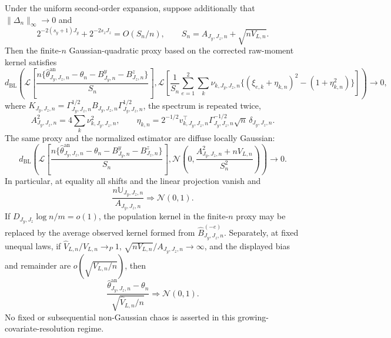 Under the uniform second-order expansion, suppose additionally that \(\|\Delta_n\|_\infty\to0\) and
\[
2^{-2(s_y+1)J_y}+2^{-2s_zJ_z}=O(S_n/n),
\qquad
S_n=A_{J_y,J_z,n}+\sqrt{nV_{L,n}}.
\]
Then the finite-\(n\) Gaussian-quadratic proxy based on the corrected raw-moment kernel satisfies
\[
d_{\mathrm{BL}}\!\left(
\mathcal L\left[\frac{n\{\widehat\theta^{\mathrm{an}}_{J_y,J_z,n}-\theta_n-B^y_{J_y,n}-B^z_{J_z,n}\}}{S_n}\right],
\mathcal L\left[\frac1{S_n}\sum_{e=1}^2\sum_k\nu_{k,J_y,J_z,n}
\{(\xi_{e,k}+\eta_{k,n})^2-(1+\eta_{k,n}^2)\}\right]
\right)\to0,
\]
where \(K_{J_y,J_z,n}=\Gamma_{J_y,J_z,n}^{1/2}B_{J_y,J_z,n}\Gamma_{J_y,J_z,n}^{1/2}\), the spectrum is repeated twice,
\[
A_{J_y,J_z,n}^2=4\sum_k\nu_{k,J_y,J_z,n}^2,
\qquad
\eta_{k,n}=2^{-1/2}v_{k,J_y,J_z,n}^{\top}\Gamma_{J_y,J_z,n}^{-1/2}\sqrt n\,\delta_{J_y,J_z,n}.
\]
The same proxy and the normalized estimator are diffuse locally Gaussian:
\[
d_{\mathrm{BL}}\!\left(
\mathcal L\left[\frac{n\{\widehat\theta^{\mathrm{an}}_{J_y,J_z,n}-\theta_n-B^y_{J_y,n}-B^z_{J_z,n}\}}{S_n}\right],
\mathcal N\!\left(0,\frac{A_{J_y,J_z,n}^2+nV_{L,n}}{S_n^2}\right)
\right)\to0.
\]
In particular, at equality all shifts and the linear projection vanish and
\[
\frac{n\mathbb U_{J_y,J_z,n}}{A_{J_y,J_z,n}}\Rightarrow\mathcal N(0,1).
\]
If \(D_{J_y,J_z}\log n/m=o(1)\), the population kernel in the finite-\(n\) proxy may be replaced by the average observed kernel formed from \(\widehat B_{J_y,J_z,n}^{(-e)}\). Separately, at fixed unequal laws, if \(\widehat V_{L,n}/V_{L,n}\to_P1\), \(\sqrt{nV_{L,n}}/A_{J_y,J_z,n}\to\infty\), and the displayed bias and remainder are \(o(\sqrt{V_{L,n}/n})\), then
\[
\frac{\widehat\theta^{\mathrm{an}}_{J_y,J_z,n}-\theta_n}{\sqrt{\widehat V_{L,n}/n}}\Rightarrow\mathcal N(0,1).
\]
No fixed or subsequential non-Gaussian chaos is asserted in this growing-covariate-resolution regime.